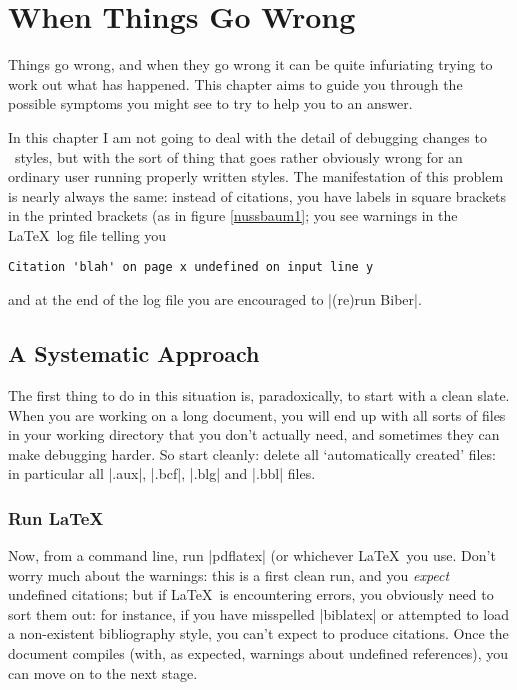 \chapter{When Things Go Wrong}\label{ch:troubleshooting}

Things go wrong, and when they go wrong it can be quite infuriating
trying to work out what has happened. This chapter aims to guide you
through the possible symptoms you might see to try to help you to an
answer.

In this chapter I am not going to deal with the detail of debugging
changes to \biblatex\ styles, but with the sort of thing that goes
rather obviously wrong for an ordinary user running properly written
styles. The manifestation of this problem is nearly always the same:
instead of citations, you have labels in square brackets in the
printed brackets (as in figure \ref{nussbaum1}; you see warnings in
the \LaTeX\ log file telling you
\begin{verbatim} 
Citation 'blah' on page x undefined on input line y
\end{verbatim}
and at the end of the log file you are encouraged to |(re)run Biber|.

\section{A Systematic Approach}

The first thing to do in this situation is, paradoxically, to start
with a clean slate.
When you are working on a long document, you will end up with all
sorts of files in your working directory that you don't actually need,
and sometimes they can make debugging harder. So start cleanly: delete
all `automatically created' files: in particular all |.aux|, |.bcf|,
|.blg| and |.bbl| files.

\subsection{Run \LaTeX}

Now, from a command line, run |pdflatex|  (or
whichever \LaTeX\ you use. Don't worry much about the warnings: this
is a first clean run, and you \emph{expect} undefined citations; but
if \LaTeX\ is encountering errors, you obviously need to sort them
out: for instance, if you have misspelled |biblatex| or attempted to
load a non-existent bibliography style, you can't expect to produce
citations. Once the document compiles (with, as expected, warnings
about undefined references), you can move on to the next stage.

